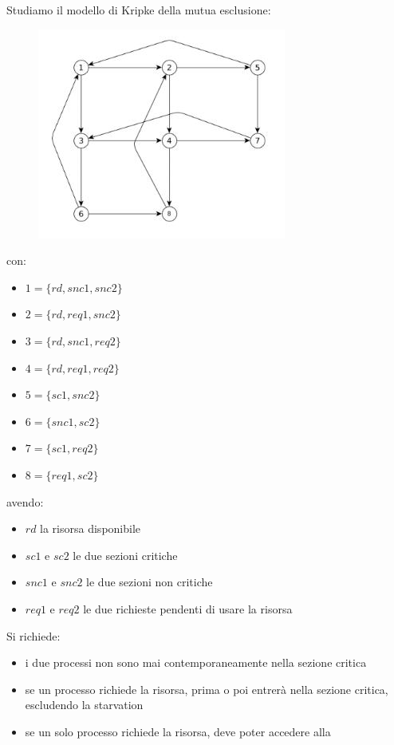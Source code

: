 \documentclass[a4paper,12pt, oneside]{book}
\begin{document}
\begin{esempio}
  Studiamo il modello di Kripke della mutua esclusione:
  \begin{figure}[H]
    \centering
    \includegraphics[scale = 0.7]{img/mc2.jpg}
  \end{figure}
  \noindent
  con:
  \begin{itemize}
    \item $1=\{rd,snc1,snc2\}$
    \item $2=\{rd,req1,snc2\}$
    \item $3=\{rd,snc1,req2\}$
    \item $4=\{rd,req1,req2\}$
    \item $5=\{sc1, snc2\}$
    \item $6=\{snc1,sc2\}$
    \item $7=\{sc1, req 2\}$
    \item $8=\{req1,sc2\}$
  \end{itemize}
  avendo:
  \begin{itemize}
    \item $rd$ la risorsa disponibile
    \item $sc1$ e $sc2$ le due sezioni critiche
    \item $snc1$ e $snc2$ le due sezioni non critiche
    \item $req1$ e $req2$ le due richieste pendenti di usare la risorsa
  \end{itemize}
  Si richiede:
  \begin{itemize}
    \item i due processi non sono mai contemporaneamente nella sezione critica
    \item se un processo richiede la risorsa, prima o poi entrerà nella sezione
    critica, escludendo la starvation
    \item se un solo processo richiede la risorsa, deve poter accedere alla

\end{itemize}
\end{esempio}
\end{document}

